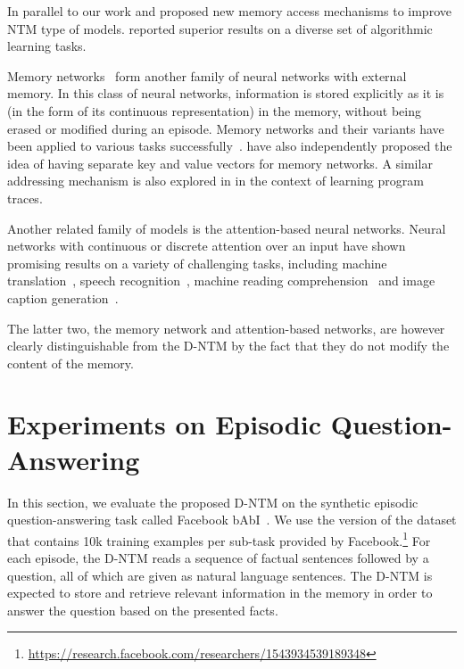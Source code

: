 \documentclass[12pt]{article}
\begin{document}
In parallel to our work \citep{yang2016lie} and \citep{graves2016hybrid} proposed
new memory access mechanisms to improve NTM type of models. \citep{graves2016hybrid}
reported superior results on a diverse set of algorithmic learning tasks.


Memory networks~\citep{weston2014memory} form another family of neural networks
with external memory. In this class of neural networks, information is stored
explicitly as it is (in the form of its continuous representation) in the
memory, without being erased or modified during an episode. Memory networks and
their variants have been applied to various tasks
successfully~\citep{sukhbaatarend,bordes2015large,dodge2015,dmn2, chandar2016hierarchical}. \cite{keyval} 
have also independently proposed the idea of having separate key and value vectors for memory networks. A similar addressing mechanism is also explored in \citep{reed2015neural} in the context of learning program traces.


Another related family of models is the attention-based neural networks. Neural
networks with continuous or discrete attention over an input have shown promising results
on a variety of challenging tasks, including machine
translation~\citep{bahdanau2014neural,luong2015effective}, speech
recognition~\citep{chorowski2015attention}, machine reading
comprehension~\citep{hermann2015teaching} and image caption
generation~\citep{xu2015show}.  

The latter two, the memory network and attention-based networks, are however
clearly distinguishable from the D-NTM by the fact that they do not modify the
content of the memory.  





\section{Experiments on Episodic Question-Answering}

In this section, we evaluate the proposed D-NTM on the synthetic episodic
question-answering task called Facebook bAbI~\citep{weston2015towards}. We use
the version of the dataset that contains 10k training examples per sub-task provided by
Facebook.\footnote{
    \url{https://research.facebook.com/researchers/1543934539189348}
} For each episode, the D-NTM reads a sequence of factual sentences followed by a
question, all of which are given as natural language sentences. The D-NTM is
expected to store and retrieve relevant information in the memory in order to
answer the question based on the presented facts. 
\end{document}
